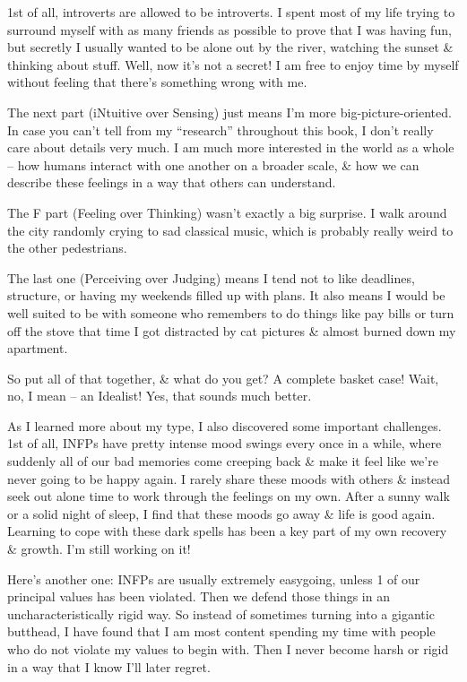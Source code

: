 \documentclass{article}
\numberwithin{equation}{section}
\begin{document}
1st of all, introverts are allowed to be introverts. I spent most of my life trying to surround myself with as many friends as possible to prove that I was having fun, but secretly I usually wanted to be alone out by the river, watching the sunset \& thinking about stuff. Well, now it's not a secret! I am free to enjoy time by myself without feeling that there's something wrong with me.

The next part (iNtuitive over Sensing) just means I'm more big-picture-oriented. In case you can't tell from my ``research'' throughout this book, I don't really care about details very much. I am much more interested in the world as a whole -- how humans interact with one another on a broader scale, \& how we can describe these feelings in a way that others can understand.

The F part (Feeling over Thinking) wasn't exactly a big surprise. I walk around the city randomly crying to sad classical music, which is probably really weird to the other pedestrians.

The last one (Perceiving over Judging) means I tend not to like deadlines, structure, or having my weekends filled up with plans. It also means I would be well suited to be with someone who remembers to do things like pay bills or turn off the stove that time I got distracted by cat pictures \& almost burned down my apartment.

So put all of that together, \& what do you get? A complete basket case! Wait, no, I mean -- an Idealist! Yes, that sounds much better.

As I learned more about my type, I also discovered some important challenges. 1st of all, INFPs have pretty intense mood swings every once in a while, where suddenly all of our bad memories come creeping back \& make it feel like we're never going to be happy again. I rarely share these moods with others \& instead seek out alone time to work through the feelings on my own. After a sunny walk or a solid night of sleep, I find that these moods go away \& life is good again. Learning to cope with these dark spells has been a key part of my own recovery \& growth. I'm still working on it!

Here's another one: INFPs are usually extremely easygoing, unless 1 of our principal values has been violated. Then we defend those things in an uncharacteristically rigid way. So instead of sometimes turning into a gigantic butthead, I have found that I am most content spending my time with people who do not violate my values to begin with. Then I never become harsh or rigid in a way that I know I'll later regret.
\end{document}
